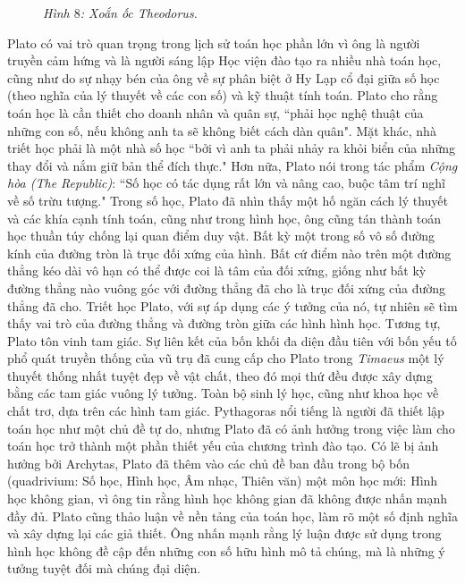 \begin{multicols}{2}
\begin{figure}[H]
				\caption{\small\textit{\color{lichsutoanhoc}Hình $8$: Xoắn ốc Theodorus.}}
				\vspace*{-10pt}
			\end{figure}
		Plato có vai trò quan trọng trong lịch sử toán học phần lớn vì ông là người truyền cảm hứng và là người sáng lập Học viện đào tạo ra nhiều nhà toán học, cũng như do sự nhạy bén của ông về sự phân biệt ở Hy Lạp cổ đại giữa số học (theo nghĩa của lý thuyết về các con số) và kỹ thuật tính toán. 
		\vskip 0.1cm
		Plato cho rằng toán học là cần thiết cho doanh nhân và quân sự, ``phải học nghệ thuật của những con số, nếu không anh ta sẽ không biết cách dàn quân".
		\vskip 0.1cm
		Mặt khác, nhà triết học phải là một nhà số học ``bởi vì anh ta phải nhảy ra khỏi biển của những thay đổi và nắm giữ bản thể đích thực." Hơn nữa, Plato nói trong tác phẩm \textit{Cộng hòa (The Republic)}: ``Số học có tác dụng rất lớn và nâng cao, buộc tâm trí nghĩ về số trừu tượng."
		\vskip 0.1cm 
		Trong số học, Plato đã nhìn thấy một hố ngăn cách lý thuyết và các khía cạnh tính toán, cũng như trong hình học, ông cũng tán thành toán học thuần túy chống lại quan điểm duy vật.  
		\vskip 0.1cm
		Bất kỳ một trong số vô số đường kính của đường tròn là trục đối xứng của hình. Bất cứ điểm nào trên một đường thẳng kéo dài vô hạn có thể được coi là tâm của đối xứng, giống như bất kỳ đường thẳng nào vuông góc với đường thẳng đã cho là trục đối xứng của đường thẳng đã cho. Triết học Plato, với sự áp dụng các ý tưởng của nó, tự nhiên sẽ tìm thấy vai trò của đường thẳng và đường tròn giữa các hình hình học. Tương tự, Plato tôn vinh tam giác.
		\vskip 0.1cm 
		Sự liên kết của bốn khối đa diện đầu tiên với bốn yếu tố phổ quát truyền thống của vũ trụ đã cung cấp cho Plato trong \textit{Timaeus}  một lý thuyết thống nhất tuyệt đẹp về vật chất, theo đó mọi thứ đều được xây dựng bằng các tam giác vuông lý tưởng. Toàn bộ sinh lý học, cũng như khoa học về chất trơ, dựa trên các hình tam giác.
		\vskip 0.1cm
		Pythagoras nổi tiếng là người đã thiết lập toán học như một chủ đề tự do, nhưng Plato đã có ảnh hưởng trong việc làm cho toán học trở thành một phần thiết yếu của chương trình đào tạo.
		\vskip 0.1cm
		Có lẽ bị ảnh hưởng bởi Archytas, Plato đã thêm vào các chủ đề ban đầu trong bộ bốn (quadrivium: Số học, Hình học, Âm nhạc, Thiên văn) một môn học mới: Hình học không gian, vì ông tin rằng hình học không gian đã không được nhấn mạnh đầy đủ. Plato cũng thảo luận về nền tảng của toán học, làm rõ một số định nghĩa và xây dựng lại các giả thiết. Ông nhấn mạnh rằng lý luận được sử dụng trong hình học không đề cập đến những con số hữu hình mô tả chúng, mà là những ý tưởng tuyệt đối mà chúng đại diện. 

\end{multicols}
